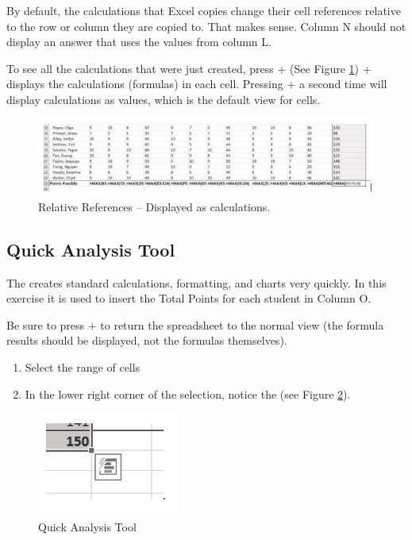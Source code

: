 By default, the calculations that Excel copies change their cell references relative to the row or column they are copied to. That makes sense. Column N should not display an answer that uses the values from column L.

To see all the calculations that were just created, press  + \fmtKeystroke{$ \sim $} (See Figure \ref{03:fig03})  + \fmtKeystroke{$ \sim $} displays the calculations (formulas) in each cell. Pressing  + \fmtKeystroke{$ \sim $} a second time will display calculations as values, which is the default view for cells.

\begin{figure}[H]
	\centering
	\includegraphics[width=\maxwidth{.95\linewidth}]{gfx/ch03_fig03}
	\caption{Relative References – Displayed as calculations.}
	\label{03:fig03}
\end{figure}

\subsection{Quick Analysis Tool}

The  creates standard calculations, formatting, and charts very quickly. In this exercise it is used to insert the Total Points for each student in Column O.

Be sure to press  + \fmtKeystroke{$ \sim $} to return the spreadsheet to the normal view (the formula results should be displayed, not the formulas themselves).

\begin{enumerate}
	\item Select the range of cells 
	\item In the lower right corner of the selection, notice the  (see Figure \ref{03:fig04}).
\end{enumerate}

\begin{figure}[H]
	\centering
	\includegraphics[width=\maxwidth{.95\linewidth}]{gfx/ch03_fig04}
	\caption{Quick Analysis Tool}
	\label{03:fig04}
\end{figure}

